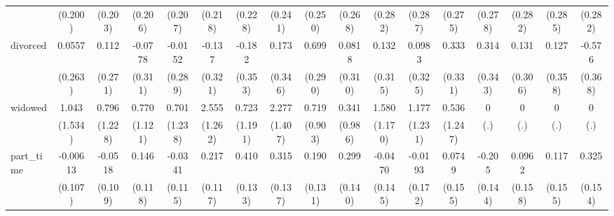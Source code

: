 {\begin{tabular}{l*{16}{c}}
                    &     (0.200)         &     (0.203)         &     (0.206)         &     (0.207)         &     (0.218)         &     (0.228)         &     (0.241)         &     (0.250)         &     (0.268)         &     (0.282)         &     (0.287)         &     (0.275)         &     (0.278)         &     (0.282)         &     (0.285)         &     (0.282)         \\
[1em]
divorced            &      0.0557         &       0.112         &     -0.0778         &     -0.0152         &      -0.137         &      -0.182         &       0.173         &       0.699\sym{*}  &      0.0818         &       0.132         &      0.0983         &       0.333         &       0.314         &       0.131         &       0.127         &      -0.576         \\
                    &     (0.263)         &     (0.271)         &     (0.311)         &     (0.289)         &     (0.321)         &     (0.353)         &     (0.346)         &     (0.290)         &     (0.310)         &     (0.315)         &     (0.325)         &     (0.331)         &     (0.343)         &     (0.306)         &     (0.358)         &     (0.368)         \\
[1em]
widowed             &       1.043         &       0.796         &       0.770         &       0.701         &       2.555\sym{*}  &       0.723         &       2.277         &       0.719         &       0.341         &       1.580         &       1.177         &       0.536         &           0         &           0         &           0         &           0         \\
                    &     (1.534)         &     (1.228)         &     (1.121)         &     (1.238)         &     (1.262)         &     (1.191)         &     (1.407)         &     (0.903)         &     (0.986)         &     (1.170)         &     (1.231)         &     (1.247)         &         (.)         &         (.)         &         (.)         &         (.)         \\
[1em]
part\_time           &    -0.00613         &     -0.0518         &       0.146         &     -0.0341         &       0.217         &       0.410\sym{**} &       0.315\sym{*}  &       0.190         &       0.299\sym{*}  &     -0.0470         &     -0.0193         &      0.0749         &      -0.205         &      0.0962         &       0.117         &       0.325\sym{*}  \\
                    &     (0.107)         &     (0.109)         &     (0.118)         &     (0.115)         &     (0.117)         &     (0.133)         &     (0.137)         &     (0.131)         &     (0.140)         &     (0.145)         &     (0.172)         &     (0.155)         &     (0.144)         &     (0.158)         &     (0.155)         &     (0.154)         \\

\end{tabular}}
